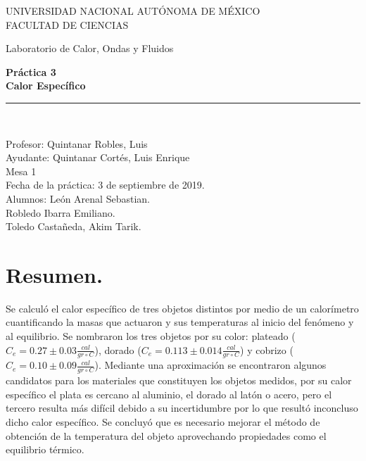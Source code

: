 \documentclass[a4paper]{article}
\begin{document}
\begin{titlepage}
\begin{center}
\begin{figure}
\end{figure}
\vspace*{0.5in}
UNIVERSIDAD NACIONAL AUTÓNOMA DE MÉXICO\\
\vspace*{0.2in}
FACULTAD DE CIENCIAS \\
\vspace*{0.5in}
\begin{large}
Laboratorio de Calor, Ondas y Fluidos\\
\end{large}
\vspace*{0.2in}
\begin{Large}
\textbf{Práctica 3} \\
\textbf{Calor Específico} \\
\end{Large}
\vspace*{0.3in}
\vspace*{0.3in}
\rule{80mm}{0.1mm}\\
\vspace*{0.1in}
\begin{large}
Profesor:  Quintanar Robles, Luis  \\
Ayudante: Quintanar Cortés, Luis Enrique \\
Mesa 1\\
Fecha de la práctica: 3 de septiembre de 2019.\\
Alumnos: León Arenal Sebastian.\\
Robledo Ibarra Emiliano. \\
Toledo Castañeda, Akim Tarik.\\

\end{large}
\end{center}
\end{titlepage}



\section*{Resumen.}
Se calculó el calor específico de tres objetos distintos por medio de un calorímetro cuantificando la masas que actuaron y sus temperaturas al inicio del fenómeno y al equilibrio. Se nombraron los tres objetos por su color: plateado ($C_e = 0.27 \pm 0.03 \frac{cal}{gr{\circ}C}$), dorado ($C_e = 0.113 \pm 0.014 \frac{cal}{gr{\circ}C}$) y cobrizo ($C_e = 0.10 \pm 0.09 \frac{cal}{gr{\circ}C}$). Mediante una aproximación se encontraron algunos candidatos para los materiales que constituyen los objetos medidos, por su calor específico el plata es cercano al aluminio, el dorado al latón o acero, pero el tercero resulta más difícil debido a su incertidumbre por lo que resultó inconcluso dicho calor específico. Se concluyó que es necesario mejorar el método de obtención de la temperatura del objeto aprovechando propiedades como el equilibrio térmico.
\end{document}
